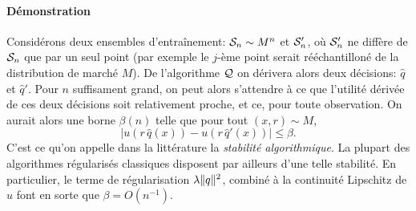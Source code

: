 \paragraph{Démonstration}

Considérons deux ensembles d'entraînement: $\S_n \sim M^n$ et $\S'_n$, où $\S'_n$ ne diffère
de $\S_n$ que par un seul point (par exemple le $j$-ème point serait rééchantilloné de la
distribution de marché $M$). De l'algorithme $\alg$ on dérivera alors deux décisions:
$\hat q$ et $\hat q'$. Pour $n$ suffisament grand, on peut alors s'attendre à ce que
l'utilité dérivée de ces deux décisions soit relativement proche, et ce, pour toute
observation. On aurait alors une borne $\beta(n)$ telle que pour tout $(x,r) \sim M$,
\begin{equation}
  |u(r\,\hat q(x)) - u(r\,\hat q'(x))| \leq \beta.
\end{equation}
C'est ce qu'on appelle dans la littérature la \textit{stabilité algorithmique}. La plupart
des algorithmes régularisés classiques disposent par ailleurs d'une telle stabilité. En
particulier, le terme de régularisation $\lambda \nq{q}^2$, combiné à la continuité
Lipschitz de $u$ font en sorte que $\beta = O(n^{-1})$. 

